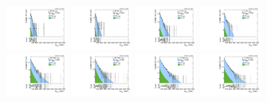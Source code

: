 \begin{figure}[htbp]
  \centering
  \includegraphics[width=0.18\textwidth]{fig/fitValidation/PostFit_SR_MVV_MJJ020to070__mu_HP_bb_LDy_Run2.pdf}
  \includegraphics[width=0.18\textwidth]{fig/fitValidation/PostFit_SR_MVV_MJJ020to070__e_HP_bb_LDy_Run2.pdf}
  \includegraphics[width=0.18\textwidth]{fig/fitValidation/PostFit_SR_MVV_MJJ020to070__mu_LP_bb_LDy_Run2.pdf}
  \includegraphics[width=0.18\textwidth]{fig/fitValidation/PostFit_SR_MVV_MJJ020to070__e_LP_bb_LDy_Run2.pdf}\\
  \includegraphics[width=0.18\textwidth]{fig/fitValidation/PostFit_SR_MVV_MJJ020to070__mu_HP_nobb_LDy_Run2.pdf}
  \includegraphics[width=0.18\textwidth]{fig/fitValidation/PostFit_SR_MVV_MJJ020to070__e_HP_nobb_LDy_Run2.pdf}
  \includegraphics[width=0.18\textwidth]{fig/fitValidation/PostFit_SR_MVV_MJJ020to070__mu_LP_nobb_LDy_Run2.pdf}
  \includegraphics[width=0.18\textwidth]{fig/fitValidation/PostFit_SR_MVV_MJJ020to070__e_LP_nobb_LDy_Run2.pdf}\\

\end{figure}
